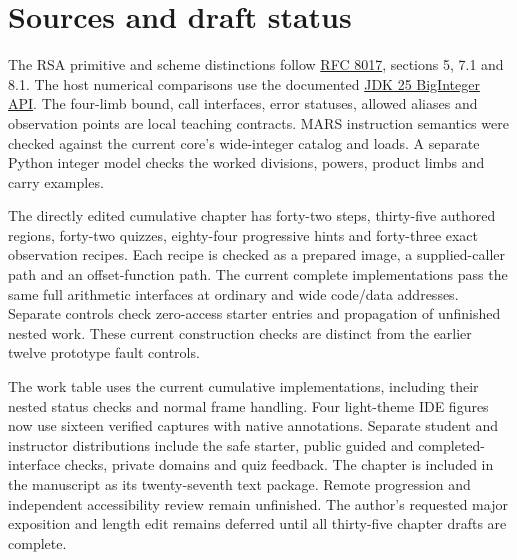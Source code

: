 \section{Sources and draft status}
The RSA primitive and scheme distinctions follow
\href{https://www.rfc-editor.org/rfc/rfc8017.html}{RFC 8017}, sections 5, 7.1 and 8.1.
The host numerical comparisons use the documented
\href{https://docs.oracle.com/en/java/javase/25/docs/api/java.base/java/math/BigInteger.html}{JDK 25 BigInteger API}.
The four-limb bound, call interfaces, error statuses, allowed aliases and observation
points are local teaching contracts. MARS instruction semantics were checked against
the current core's wide-integer catalog and loads. A separate Python integer model
checks the worked divisions, powers, product limbs and carry examples.

The directly edited cumulative chapter has forty-two steps, thirty-five authored
regions, forty-two quizzes, eighty-four progressive hints and forty-three exact
observation recipes. Each recipe is checked as a prepared image, a supplied-caller path
and an offset-function path. The current complete implementations pass the same full
arithmetic interfaces at ordinary and wide code/data addresses. Separate controls check
zero-access starter entries and propagation of unfinished nested work. These current
construction checks are distinct from the earlier twelve prototype fault controls.

The work table uses the current cumulative implementations, including their nested
status checks and normal frame handling. Four light-theme IDE figures now use sixteen
verified captures with native annotations. Separate student and instructor distributions include the safe starter, public guided
and completed-interface checks, private domains and quiz feedback. The chapter is included
in the manuscript as its twenty-seventh text package. Remote progression and independent
accessibility review remain unfinished. The author's requested major exposition and length edit remains deferred
until all thirty-five chapter drafts are complete.
